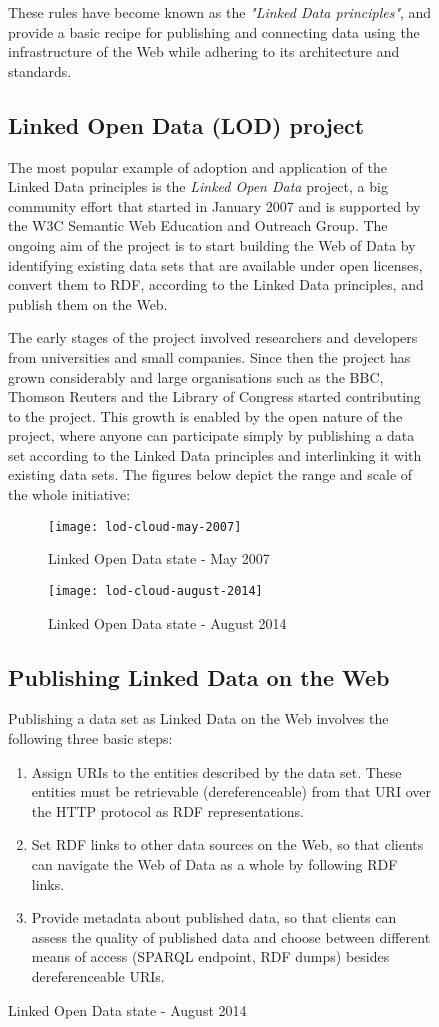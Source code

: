 \begin{figure}[h!]
These rules have become known as the \textit{"Linked Data principles"}, and provide a basic recipe for publishing and connecting data using the infrastructure of the Web while adhering to its architecture and standards.

\subsection{Linked Open Data (LOD) project}

The most popular example of adoption and application of the Linked Data principles is
the \textit{Linked Open Data} project, a big community effort that started in January
2007 and is supported by the W3C Semantic Web Education and Outreach Group. The ongoing aim of the project is to start building the Web of Data by identifying existing data sets that are available under open licenses, convert them to RDF, according to the Linked Data principles, and publish them on the Web.

The early stages of the project involved researchers and developers from universities and small companies. Since then the project has grown
considerably and large organisations such as the BBC, Thomson Reuters and the Library of Congress started contributing to the project. This growth is enabled by the open nature of the project, where anyone can participate simply by publishing a data set according to the Linked Data principles and interlinking it with existing data sets. The figures below depict the range and scale of the whole initiative: 

\begin{figure}[h!]
    \texttt{[image: lod-cloud-may-2007]}
    \caption{Linked Open Data state - May 2007}
    \label{fig:view}
\end{figure}

\begin{figure}[h!]
    \texttt{[image: lod-cloud-august-2014]}
    \caption{Linked Open Data state - August 2014}
    \label{fig:view}
\end{figure}

\subsection{Publishing Linked Data on the Web}
Publishing a data set as Linked Data on the Web involves the following three basic steps:
\begin{enumerate}
    \item Assign URIs to the entities described by the data set. These entities must be retrievable (dereferenceable) from that URI over the HTTP protocol as RDF representations.
    \item Set RDF links to other data sources on the Web, so that clients can navigate the Web of
    Data as a whole by following RDF links.
    \item Provide metadata about published data, so that clients can assess the quality of published data and choose between different means of access (SPARQL endpoint, RDF dumps) besides dereferenceable URIs.
\end{enumerate}


\end{figure}
